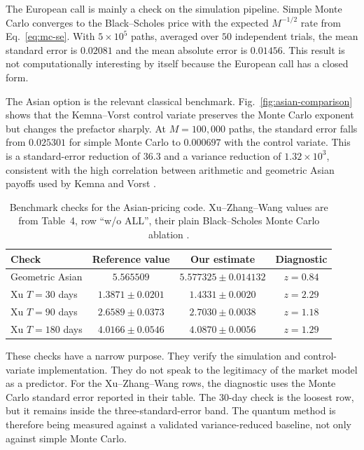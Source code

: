 \documentclass[12pt]{article}
\begin{document}
The European call is mainly a check on the simulation pipeline.  Simple Monte Carlo converges to the Black--Scholes price with the expected $M^{-1/2}$ rate from Eq.~\eqref{eq:mc-se}.  With $5\times 10^5$ paths, averaged over $50$ independent trials, the mean standard error is $0.02081$ and the mean absolute error is $0.01456$.  This result is not computationally interesting by itself because the European call has a closed form.

The Asian option is the relevant classical benchmark.  Fig.~\ref{fig:asian-comparison} shows that the Kemna--Vorst control variate preserves the Monte Carlo exponent but changes the prefactor sharply.  At $M=100{,}000$ paths, the standard error falls from $0.025301$ for simple Monte Carlo to $0.000697$ with the control variate.  This is a standard-error reduction of $36.3$ and a variance reduction of $1.32\times 10^3$, consistent with the high correlation between arithmetic and geometric Asian payoffs used by Kemna and Vorst \cite{kemnaPricingMethodOptions1990,glassermanMonteCarloMethods2004}.

\begin{table}[H]
    \centering
    \caption{Benchmark checks for the Asian-pricing code.  Xu--Zhang--Wang values are from Table~4, row ``w/o ALL'', their plain Black--Scholes Monte Carlo ablation \cite{xuPricingArithmeticAverage2023}.}
    \label{tab:asian-benchmark-checks}
    \begin{tabular}{lccc}
        \toprule
        Check & Reference value & Our estimate & Diagnostic \\
        \midrule
        Geometric Asian & $5.565509$ & $5.577325\pm0.014132$ & $z=0.84$ \\
        Xu $T=30$ days  & $1.3871\pm0.0201$ & $1.4331\pm0.0020$ & $z=2.29$ \\
        Xu $T=90$ days  & $2.6589\pm0.0373$ & $2.7030\pm0.0038$ & $z=1.18$ \\
        Xu $T=180$ days & $4.0166\pm0.0546$ & $4.0870\pm0.0056$ & $z=1.29$ \\
        \bottomrule
    \end{tabular}
\end{table}

These checks have a narrow purpose.  They verify the simulation and control-variate implementation. They do not speak to the legitimacy of the market model as a predictor. For the Xu--Zhang--Wang rows, the diagnostic uses the Monte Carlo standard error reported in their table.  The $30$-day check is the loosest row, but it remains inside the three-standard-error band.  The quantum method is therefore being measured against a validated variance-reduced baseline, not only against simple Monte Carlo.
\end{document}
